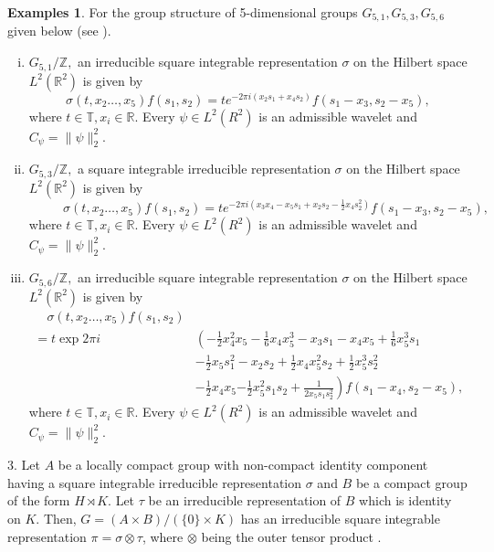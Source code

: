 \documentclass[11pt,reqno]{amsart}
\numberwithin{equation}{section}
\theoremstyle{definition}
\newtheorem{exs}[thm]{\sc Examples}
\begin{document}
\begin{exs}
\noindent For the group structure of 5-dimensional groups $G_{5,1}, G_{5,3},G_{5,6}$ given below (see \cite{Niel:83}).
\begin{enumerate}[(i)]
\item [(ii)] $G_{5,1}/\mathbb{Z},$ an irreducible square integrable  representation $ \sigma $ on the  Hilbert space $ L^2(\mathbb{R}^2)$ is given by 
$$\sigma(t,x_2\dots , x_5)f(s_1,s_2) = te^{-2\pi i(x_2s_1+x_4s_2)}f(s_1-x_3,s_2-x_5),$$
where $t\in \mathbb{T}, x_i \in \mathbb{R}.$ 
Every $\psi \in L^2(R^2)$ is an admissible wavelet and $C_{\psi} = \|\psi\|_2^2$.
\item [(iii)] $G_{5,3}/\mathbb{Z},$ a square integrable irreducible representation $ \sigma $ on the Hilbert space $ L^2(\mathbb{R}^2)$ is given by 
$$ \text{ } \qquad \sigma(t,x_2\dots , x_5)f(s_1,s_2) = te^{-2\pi i(x_3x_4 -x_5s_1+x_2s_2-\frac{1}{2}x_4s_2^2)}f(s_1-x_3,s_2-x_5),$$
where $t\in \mathbb{T}, x_i \in \mathbb{R}.$ 
Every $\psi \in L^2(R^2)$ is an admissible wavelet and $C_{\psi} = \|\psi\|_2^2$.
\item[(iv)]  $G_{5,6}/\mathbb{Z},$ an irreducible square integrable representation $ \sigma $ on the Hilbert space $ L^2(\mathbb{R}^2)$ is given by 
\begin{align*} 
\quad \sigma(t,x_2\dots , x_5)f(s_1,s_2) \\
 = t\exp2\pi i&\left( -\frac{1}{2}x_4^2x_5-\frac{1}{6}x_4x_5^3\right.-x_3s_1-x_4x_5+\frac{1}{6}x_5^3s_1\\
 &-\frac{1}{2}x_5s_1^2-x_2s_2+\frac{1}{2}x_4x_5^2s_2+\frac{1}{2}x_5^3s_2^2\\
 & -\frac{1}{2}x_4x_5\left.-\frac{1}{2}x_5^2s_1s_2+\frac{1}{2x_5s_1s_2^2} \right)f(s_1-x_4,s_2-x_5),
\end{align*}
where $t\in \mathbb{T}, x_i \in \mathbb{R}.$ 
Every $\psi \in L^2(R^2)$ is an admissible wavelet and $C_{\psi} = \|\psi\|_2^2$.
\end{enumerate}
3. Let $A$ be a locally compact group  with non-compact identity component having a square integrable irreducible representation $\sigma$ and $B$ be a compact group of the form $H\rtimes K$. Let $\tau$ be an irreducible representation of $B$ which is identity on $K$. Then, $ G = (A \times B)/({\{0\}\times K})$ has an irreducible square integrable representation $\pi = \sigma \otimes \tau$, where $\otimes $ being the outer tensor product \cite[Theorem 7.17]{fol}. 
\end{exs}

\end{document}
